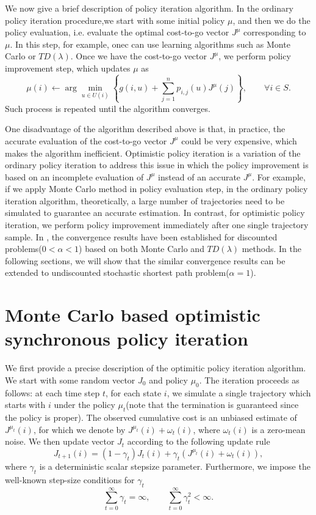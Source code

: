 \documentclass[12pt,a4paper]{amsart}
\numberwithin{equation}{section}
\theoremstyle{plain}
\theoremstyle{definition}
\begin{document}
We now give a brief description of policy iteration algorithm. In the ordinary policy iteration procedure,we start with some initial policy $\mu$, and then we do the policy evaluation, i.e. evaluate the optimal cost-to-go vector $J^{\mu}$ corresponding to $\mu$. In this step, for example, onec can use learning algorithms such as Monte Carlo or $TD(\lambda)$. Once we have the cost-to-go vector $J^{\mu}$, we perform policy improvement step, which updates $\mu$ as 
$$
\mu(i) \leftarrow \arg \min_{u \in U(i)} \left\{ g(i, u) + \sum_{j =1}^{n} p_{i,j}(u) J^{\mu} (j) \right\}, \qquad \forall i \in S. 
$$
Such process is repeated until the algorithm converges. 

One disadvantage of the algorithm described above is that, in practice,  the accurate evaluation of the cost-to-go vector $J^{\mu}$ could be very expensive, which makes the algorithm inefficient.  Optimistic policy iteration is a variation of the ordinary policy iteration to address this issue in which the policy improvement is based on an incomplete evaluation of $J^{\mu}$ instead of an accurate $J^{\mu}$.  For example, if we apply Monte Carlo method in policy evaluation step, in the ordinary policy iteration algorithm, theoretically, a large number of trajectories need to be simulated to guarantee an accurate estimation. In contrast, for optimistic policy iteration, we perform policy improvement immediately after one single trajectory sample.  In \cite{Ts03}, the convergence results have been established for discounted problems($0<\alpha < 1$) based on both Monte Carlo and $TD(\lambda)$ methods. In the following sections, we will show that the similar convergence results can be extended to undiscounted stochastic shortest path problem($\alpha =1$). 

\section{Monte Carlo based optimistic synchronous policy iteration}
We first provide a precise description of the optimitic policy iteration algorithm. We start with some random vector $J_0$ and policy $\mu_0$. The iteration proceeds as follows: at each time step $t$,  for each state $i$, we simulate a single trajectory which starts with $i$ under the policy $\mu_t$(note that the termination is guaranteed since the policy is proper). The observed cumulative cost is an unbiased estimate of $J^{\mu_t}(i)$, for which we denote by $J^{\mu_t}(i) + \omega_t(i)$, where $\omega_t(i)$ is a zero-mean noise. We then update vector $J_t$ according to the following update rule
\begin{equation} \label{updaterule}
	J_{t+1} (i) = (1-\gamma_t) J_t(i) + \gamma_t (J^{\mu_t}(i) + \omega_t(i)),
\end{equation}
where $\gamma_t$ is a deterministic scalar stepsize parameter. Furthermore, we impose the well-known step-size conditions for $\gamma_t$
$$
\sum_{t=0}^{\infty} \gamma_t= \infty, \qquad \sum_{t=0}^{\infty} \gamma_t^2 < \infty. 
$$
\end{document}
